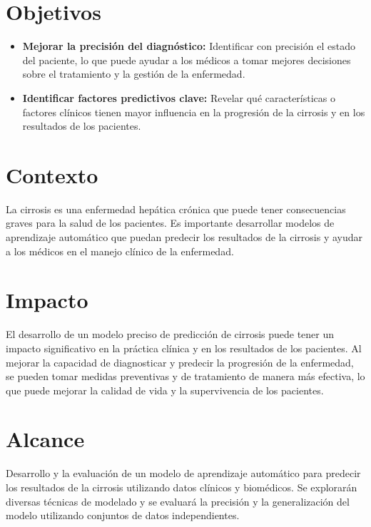 \documentclass[11pt,a4paper]{report}
\begin{document}
\pagestyle{fancy}
\setcounter{page}{1}

\section*{Objetivos}

\begin{itemize}
    \item \textbf{Mejorar la precisión del diagnóstico:} Identificar con precisión el estado del paciente, lo que puede ayudar a los médicos a tomar mejores decisiones sobre el tratamiento y la gestión de la enfermedad.
    \item \textbf{Identificar factores predictivos clave:} Revelar qué características o factores clínicos tienen mayor influencia en la progresión de la cirrosis y en los resultados de los pacientes.
\end{itemize}

\section*{Contexto}

La cirrosis es una enfermedad hepática crónica que puede tener consecuencias graves para la salud de los pacientes. Es importante desarrollar modelos de aprendizaje automático que puedan predecir los resultados de la cirrosis y ayudar a los médicos en el manejo clínico de la enfermedad.

\section*{Impacto}

El desarrollo de un modelo preciso de predicción de cirrosis puede tener un impacto significativo en la práctica clínica y en los resultados de los pacientes. Al mejorar la capacidad de diagnosticar y predecir la progresión de la enfermedad, se pueden tomar medidas preventivas y de tratamiento de manera más efectiva, lo que puede mejorar la calidad de vida y la supervivencia de los pacientes.

\section*{Alcance}

Desarrollo y la evaluación de un modelo de aprendizaje automático para predecir los resultados de la cirrosis utilizando datos clínicos y biomédicos. Se explorarán diversas técnicas de modelado y se evaluará la precisión y la generalización del modelo utilizando conjuntos de datos independientes.
\end{document}
